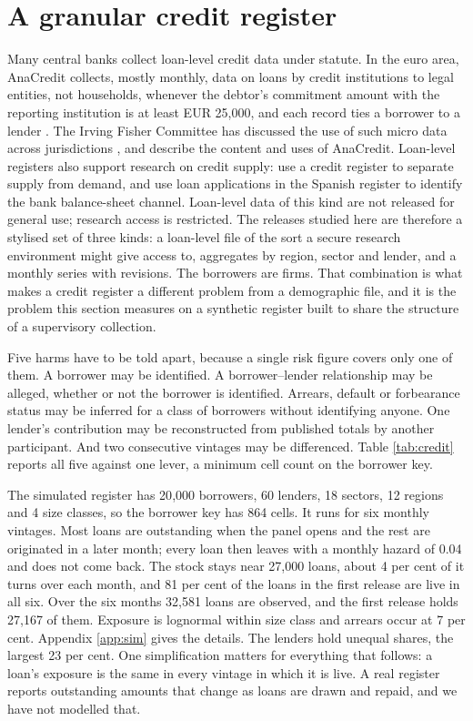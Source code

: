 \documentclass[11pt,a4paper]{article}
\theoremstyle{plain}
\theoremstyle{definition}
\theoremstyle{definition}
\theoremstyle{plain}
\begin{document}
\section{A granular credit register}\label{sec:credit}

Many central banks collect loan-level credit data under statute. In the euro
area, AnaCredit collects, mostly monthly, data on loans by credit institutions to
legal entities, not households, whenever the debtor's commitment amount with the
reporting institution is at least EUR 25{,}000, and each record ties a borrower to
a lender \citep{ecb2022}. The Irving Fisher Committee has discussed the use of
such micro data across jurisdictions \citep{ifc2016}, and \citet{israel2017}
describe the content and uses of AnaCredit. Loan-level registers also support
research on credit supply: \citet{khwaja2008} use a credit register to separate
supply from demand, and \citet{jimenez2012} use loan applications in the Spanish
register to identify the bank balance-sheet channel. Loan-level data of this
kind are not released for general use; research access is restricted. The
releases studied here are therefore a stylised set of three kinds: a loan-level
file of the sort a secure research environment might give access to, aggregates
by region, sector and lender, and a monthly series with revisions. The borrowers
are firms. That combination is what makes a credit register a different problem
from a demographic file, and it is the problem this section measures on a
synthetic register built to share the structure of a supervisory collection.

Five harms have to be told apart, because a single risk figure covers only one of
them. A borrower may be identified. A borrower--lender relationship may be
alleged, whether or not the borrower is identified. Arrears, default or
forbearance status may be inferred for a class of borrowers without identifying
anyone. One lender's contribution may be reconstructed from published totals by
another participant. And two consecutive vintages may be differenced. Table
\ref{tab:credit} reports all five against one lever, a minimum cell count on the
borrower key.

The simulated register has 20{,}000 borrowers, 60 lenders, 18 sectors, 12
regions and 4 size classes, so the borrower key has 864 cells. It runs for six
monthly vintages. Most loans are outstanding when the panel opens and the rest
are originated in a later month; every loan then leaves with a monthly hazard of
0.04 and does not come back. The stock stays near 27{,}000 loans, about 4 per
cent of it turns over each month, and 81 per cent of the loans in the first
release are live in all six. Over the six months 32{,}581 loans are observed,
and the first release holds 27{,}167 of them. Exposure is lognormal within size
class and arrears occur at 7 per cent. Appendix \ref{app:sim} gives the details.
The lenders hold unequal shares, the largest 23 per cent. One simplification
matters for everything that follows: a loan's exposure is the same in every
vintage in which it is live. A real register reports outstanding amounts that
change as loans are drawn and repaid, and we have not modelled that.
\end{document}

